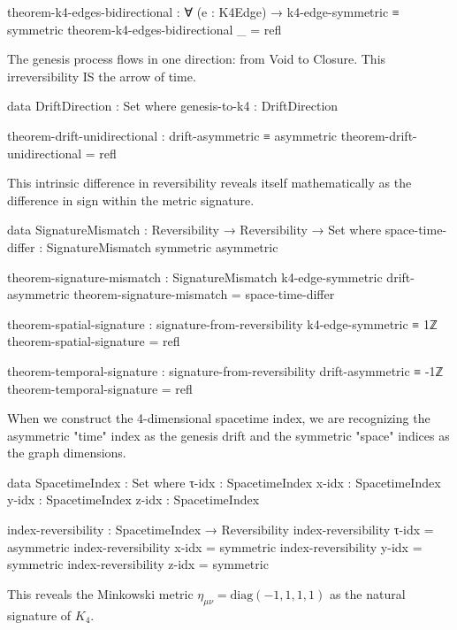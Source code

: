 \documentclass[11pt,a4paper]{book}
\begin{document}
\begin{code}
theorem-k4-edges-bidirectional : ∀ (e : K4Edge) → k4-edge-symmetric ≡ symmetric
theorem-k4-edges-bidirectional _ = refl

\end{code}

The genesis process flows in one direction: from Void to Closure. This irreversibility IS the arrow of time.

\begin{code}
data DriftDirection : Set where
  genesis-to-k4 : DriftDirection

theorem-drift-unidirectional : drift-asymmetric ≡ asymmetric
theorem-drift-unidirectional = refl
\end{code}

This intrinsic difference in reversibility reveals itself mathematically as the difference in sign within the metric signature.

\begin{code}
data SignatureMismatch : Reversibility → Reversibility → Set where
  space-time-differ : SignatureMismatch symmetric asymmetric

theorem-signature-mismatch : SignatureMismatch k4-edge-symmetric drift-asymmetric
theorem-signature-mismatch = space-time-differ
\end{code}

\begin{code}
theorem-spatial-signature : signature-from-reversibility k4-edge-symmetric ≡ 1ℤ
theorem-spatial-signature = refl

theorem-temporal-signature : signature-from-reversibility drift-asymmetric ≡ -1ℤ
theorem-temporal-signature = refl
\end{code}

When we construct the 4-dimensional spacetime index, we are recognizing the asymmetric "time" index as the genesis drift and the symmetric "space" indices as the graph dimensions.

\begin{code}
data SpacetimeIndex : Set where
  τ-idx : SpacetimeIndex
  x-idx : SpacetimeIndex
  y-idx : SpacetimeIndex
  z-idx : SpacetimeIndex

index-reversibility : SpacetimeIndex → Reversibility
index-reversibility τ-idx = asymmetric
index-reversibility x-idx = symmetric
index-reversibility y-idx = symmetric
index-reversibility z-idx = symmetric
\end{code}

This reveals the Minkowski metric $\eta_{\mu\nu} = \text{diag}(-1, 1, 1, 1)$ as the natural signature of $K_4$.
\end{document}
